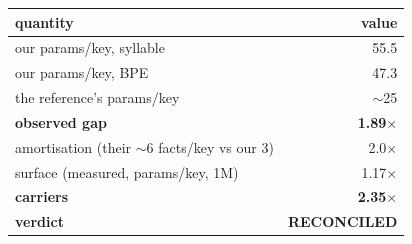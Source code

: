 \begin{tabular}{@{}lr@{}}
\toprule
quantity & value \\
\midrule
our params/key, syllable & 55.5 \\
our params/key, BPE & 47.3 \\
the reference's params/key & $\sim$25 \\
\textbf{observed gap} & \textbf{1.89$\times$} \\
\midrule
amortisation (their $\sim$6 facts/key vs our 3) & 2.0$\times$ \\
surface (measured, params/key, 1M) & 1.17$\times$ \\
\textbf{carriers} & \textbf{2.35$\times$} \\
\midrule
\textbf{verdict} & \textbf{RECONCILED} \\
\bottomrule
\end{tabular}
